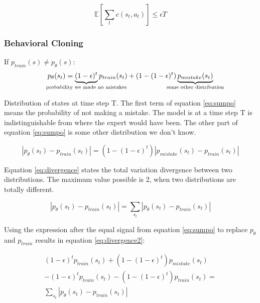 \documentclass[]{article}
\begin{document}
\begin{equation}
    \mathbb{E} \left[ \sum_{t} c(s_{t},a_{t}) \right] \leq \epsilon T
\end{equation}

\subsubsection*{Behavioral Cloning}
\par If $p_{train} (s)\neq p_{\theta}(s)$:
\begin{equation}
    \label{eq:sumpo}
    p_{\theta}(s_{t}) =\underbrace{(1 - \epsilon)^{t}}_{\mathclap{\text{probability we made no mistakes}}} p_{train}(s_{t})
    +(1 - (1 - \epsilon)^{t})\underbrace{p_{mistake}(s_{t})}_{\mathclap{\text{some other distribution}}}
\end{equation}

\par 
Distribution of states at time step T.  The first term of equation \eqref{eq:sumpo} means the probability of not
making a mistake. The model is at a time step T is indistinguishable from where the expert would have been. The other
part of equation \eqref{eq:sumpo}  is some other distribution we don't know. 

\begin{equation}
    \label{eq:divergence}
    |p_{\theta}(s_{t}) - p_{train}(s_{t})| = (1 - (1 - \epsilon)^{t})|p_{mistake}(s_{t}) - p_{train}(s_{t})|
\end{equation}
\par Equation \eqref{eq:divergence} states the total variation divergence between two distributions.  The maximum
value possible is 2, when two distributions are totally different. 

\begin{equation}
    \label{eq:divergence2}
    |p_{\theta}(s_{t}) - p_{train}(s_{t})| = \sum_{s_{t}}|p_{\theta}(s_{t}) - p_{train}(s_{t})|
\end{equation}

\par  Using the expression after the equal signal from equation \eqref{eq:sumpo} to replace $p_{\theta}$ and $p_{train}$
results in equation \eqref{eq:divergence2}:  

\begin{equation}
    \label{eq:divergence3}
    \begin{split}
    (1 - \epsilon)^{t} p_{train}(s_{t}) + (1 - (1 - \epsilon)^{t})p_{mistake}(s_{t}) \\ 
    - (1 - \epsilon)^{t}    p_{train}(s_{t}) - (1 - (1 - \epsilon)^{t})p_{train}(s_{t}) = \\
    \sum_{s_{t}}|p_{\theta}(s_{t}) - p_{train}(s_{t})|
    \end{split}
\end{equation}
\end{document}
